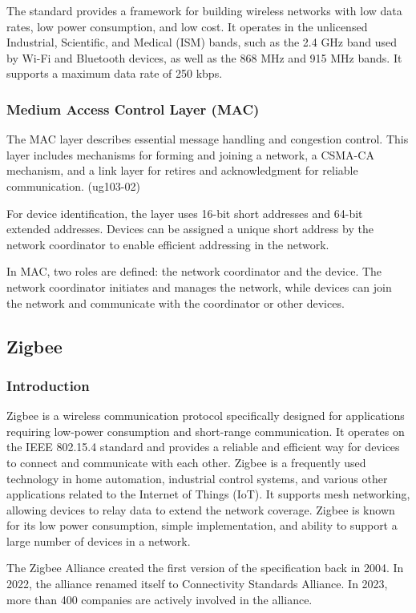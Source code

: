 The standard provides a framework for building wireless networks with low data rates, low power consumption, and low cost.
It operates in the unlicensed Industrial, Scientific, and Medical (ISM) bands, such as the 2.4 GHz band used by Wi-Fi
and Bluetooth devices, as well as the 868 MHz and 915 MHz bands.
It supports a maximum data rate of 250 kbps.

\subsubsection{Medium Access Control Layer (MAC)}
The MAC layer describes essential message handling and congestion control.
This layer includes mechanisms for forming and joining a network, a CSMA-CA mechanism,
and a link layer for retires and acknowledgment for reliable communication. (ug103-02)

For device identification, the layer uses 16-bit short addresses and 64-bit extended addresses.
Devices can be assigned a unique short address by the network coordinator to enable efficient addressing in the network.

In MAC, two roles are defined: the network coordinator and the device.
The network coordinator initiates and manages the network, while devices can join the network
and communicate with the coordinator or other devices.


\subsection{Zigbee}
\label{sec:zig}

\subsubsection{Introduction}
\label{zb:into}
Zigbee is a wireless communication protocol specifically designed for
applications requiring low-power consumption and short-range communication.
It operates on the IEEE 802.15.4 standard and provides a reliable and efficient way
for devices to connect and communicate with each other.
Zigbee is a frequently used technology in home automation, industrial control systems,
and various other applications related to the Internet of Things (IoT).
It supports mesh networking, allowing devices to relay data to extend the network
coverage. Zigbee is known for its low power consumption, simple implementation, and
ability to support a large number of devices in a network.

The Zigbee Alliance created the first version of the specification back in 2004.
In 2022, the alliance renamed itself to Connectivity Standards Alliance.
In 2023, more than 400 companies are actively involved in the alliance. \cite{csa:members}

